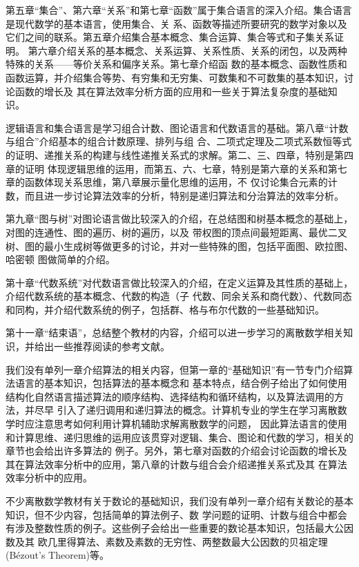 第五章“集合”、第六章“关系”和第七章“函数”属于集合语言的深入介绍。集合语言是现代数学的基本语言，使用集合、关
系、函数等描述所要研究的数学对象以及它们之间的联系。第五章介绍集合基本概念、集合运算、集合等式和子集关系证明。
第六章介绍关系的基本概念、关系运算、关系性质、关系的闭包，以及两种特殊的关系——等价关系和偏序关系。第七章介绍函
数的基本概念、函数性质和函数运算，并介绍集合等势、有穷集和无穷集、可数集和不可数集的基本知识，讨论函数的增长及
其在算法效率分析方面的应用和一些关于算法复杂度的基础知识。

逻辑语言和集合语言是学习组合计数、图论语言和代数语言的基础。第八章“计数与组合”介绍基本的组合计数原理、排列与组
合、二项式定理及二项式系数恒等式的证明、递推关系的构建与线性递推关系式的求解。第二、三、四章，特别是第四章的证明
体现逻辑思维的运用，而第五、六、七章，特别是第六章的关系和第七章的函数体现关系思维，第八章展示量化思维的运用，不
仅讨论集合元素的计数，而且进一步讨论算法效率的分析，特别是递归算法和分治算法的效率分析。

第九章“图与树”对图论语言做比较深入的介绍，在总结图和树基本概念的基础上，对图的连通性、图的遍历、树的遍历，以及
带权图的顶点间最短距离、最优二叉树、图的最小生成树等做更多的讨论，并对一些特殊的图，包括平面图、欧拉图、哈密顿
图做简单的介绍。

第十章“代数系统”对代数语言做比较深入的介绍，在定义运算及其性质的基础上，介绍代数系统的基本概念、代数的构造（子
代数、同余关系和商代数）、代数同态和同构，并介绍代数系统的例子，包括群、格与布尔代数的一些基础知识。

第十一章“结束语”，总结整个教材的内容，介绍可以进一步学习的离散数学相关知识，并给出一些推荐阅读的参考文献。

我们没有单列一章介绍算法的相关内容，但第一章的“基础知识”有一节专门介绍算法语言的基本知识，包括算法的基本概念和
基本特点，结合例子给出了如何使用结构化自然语言描述算法的顺序结构、选择结构和循环结构，以及算法调用的方法，并尽早
引入了递归调用和递归算法的概念。计算机专业的学生在学习离散数学时应注意思考如何利用计算机辅助求解离散数学的问题，
因此算法语言的使用和计算思维、递归思维的运用应该贯穿对逻辑、集合、图论和代数的学习，相关的章节也会给出许多算法的
例子。另外，第七章对函数的介绍会讨论函数的增长及其在算法效率分析中的应用，第八章的计数与组合会介绍递推关系式及其
在算法效率分析中的应用。

不少离散数学教材有关于数论的基础知识，我们没有单列一章介绍有关数论的基本知识，但不少内容，包括简单的算法例子、数
学问题的证明、计数与组合中都会有涉及整数性质的例子。这些例子会给出一些重要的数论基本知识，包括最大公因数及其
欧几里得算法、素数及素数的无穷性、两整数最大公因数的贝祖定理(B\'{e}zout's Theorem)等。

